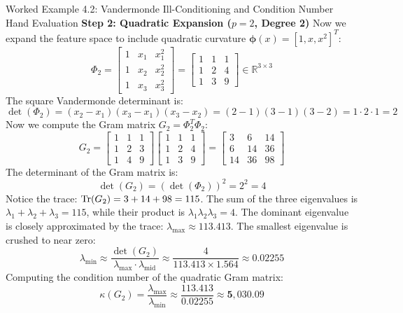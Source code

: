 \begin{examplebox}{Worked Example 4.2: Vandermonde Ill-Conditioning and Condition Number Hand Evaluation}
\textbf{Step 2: Quadratic Expansion ($p = 2$, Degree 2)}
Now we expand the feature space to include quadratic curvature $\boldsymbol{\phi}(x) = [1, x, x^2]^T$:
\begin{equation*}
\Phi_2 = \begin{bmatrix} 1 & x_1 & x_1^2 \\ 1 & x_2 & x_2^2 \\ 1 & x_3 & x_3^2 \end{bmatrix} = \begin{bmatrix} 1 & 1 & 1 \\ 1 & 2 & 4 \\ 1 & 3 & 9 \end{bmatrix} \in \mathbb{R}^{3 \times 3}
\end{equation*}
The square Vandermonde determinant is:
\begin{equation*}
\det(\Phi_2) = (x_2 - x_1)(x_3 - x_1)(x_3 - x_2) = (2 - 1)(3 - 1)(3 - 2) = 1 \cdot 2 \cdot 1 = 2
\end{equation*}
Now we compute the Gram matrix $G_2 = \Phi_2^T \Phi_2$:
\begin{equation*}
G_2 = \begin{bmatrix} 1 & 1 & 1 \\ 1 & 2 & 3 \\ 1 & 4 & 9 \end{bmatrix} \begin{bmatrix} 1 & 1 & 1 \\ 1 & 2 & 4 \\ 1 & 3 & 9 \end{bmatrix} = \begin{bmatrix} 3 & 6 & 14 \\ 6 & 14 & 36 \\ 14 & 36 & 98 \end{bmatrix}
\end{equation*}
The determinant of the Gram matrix is:
\begin{equation*}
\det(G_2) = (\det(\Phi_2))^2 = 2^2 = 4
\end{equation*}
Notice the trace: $\operatorname{Tr}(G_2) = 3 + 14 + 98 = 115$.
The sum of the three eigenvalues is $\lambda_1 + \lambda_2 + \lambda_3 = 115$, while their product is $\lambda_1 \lambda_2 \lambda_3 = 4$.
The dominant eigenvalue is closely approximated by the trace: $\lambda_{\max} \approx 113.413$.
The smallest eigenvalue is crushed to near zero:
\begin{equation*}
\lambda_{\min} \approx \frac{\det(G_2)}{\lambda_{\max} \cdot \lambda_{\text{mid}}} \approx \frac{4}{113.413 \times 1.564} \approx 0.02255
\end{equation*}
Computing the condition number of the quadratic Gram matrix:
\begin{equation*}
\kappa(G_2) = \frac{\lambda_{\max}}{\lambda_{\min}} \approx \frac{113.413}{0.02255} \approx \mathbf{5{,}030.09}
\end{equation*}


\end{examplebox}
